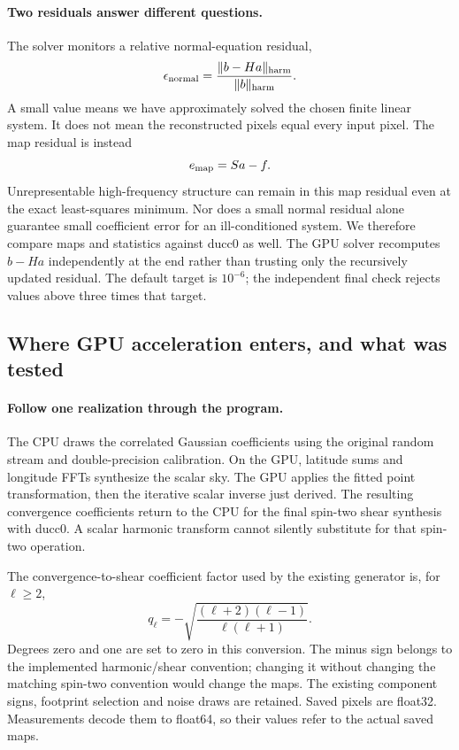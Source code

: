 \documentclass[11pt]{article}
\begin{document}
\paragraph{Two residuals answer different questions.}
The solver monitors a relative normal-equation residual,
\begin{equation}
 \epsilon_{\rm normal}=
 \frac{\|b-Ha\|_{\rm harm}}{\|b\|_{\rm harm}}.
\end{equation}
A small value means we have approximately solved the chosen finite linear
system. It does not mean the reconstructed pixels equal every input pixel.
The map residual is instead
\begin{equation}
 e_{\rm map}=Sa-f.
\end{equation}
Unrepresentable high-frequency structure can remain in this map residual
even at the exact least-squares minimum. Nor does a small normal residual
alone guarantee small coefficient error for an ill-conditioned system.
We therefore compare maps and statistics against ducc0 as well. The GPU
solver recomputes $b-Ha$ independently at the end rather than trusting
only the recursively updated residual. The default target is $10^{-6}$;
the independent final check rejects values above three times that target.

\subsection{Where GPU acceleration enters, and what was tested}

\paragraph{Follow one realization through the program.}
The CPU draws the correlated Gaussian coefficients using the original
random stream and double-precision calibration. On the GPU, latitude sums
and longitude FFTs synthesize the scalar sky. The GPU applies the fitted
point transformation, then the iterative scalar inverse just derived.
The resulting convergence coefficients return to the CPU for the final
spin-two shear synthesis with ducc0. A scalar harmonic transform cannot
silently substitute for that spin-two operation.

The convergence-to-shear coefficient factor used by the existing generator
is, for $\ell\ge2$,
\begin{equation}
 q_\ell=-\sqrt{\frac{(\ell+2)(\ell-1)}{\ell(\ell+1)}}.
\end{equation}
Degrees zero and one are set to zero in this conversion. The minus sign
belongs to the implemented harmonic/shear convention; changing it without
changing the matching spin-two convention would change the maps. The
existing component signs, footprint selection and noise draws are retained.
Saved pixels are float32. Measurements decode them to float64, so their
values refer to the actual saved maps.
\end{document}
